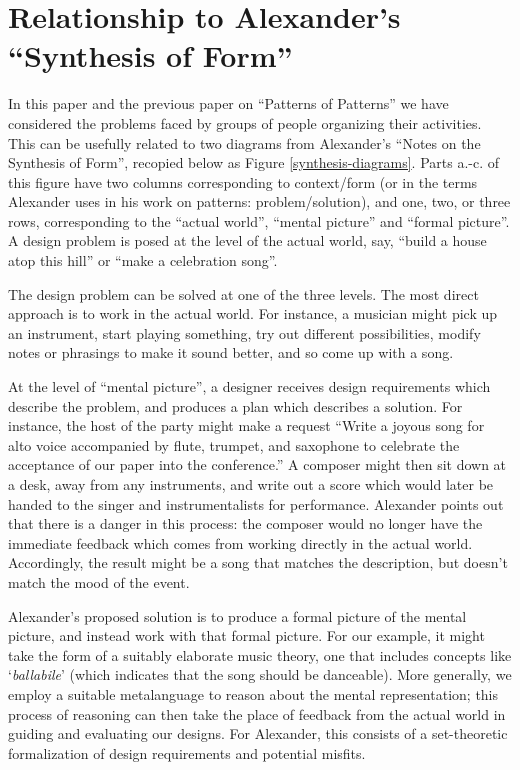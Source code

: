 \documentclass[acmlarge,timestamp]{acmart}
\begin{document}
\appendix
\renewcommand\thefigure{\thesection.\arabic{figure}}

\setcounter{figure}{0}
\section{Relationship to Alexander’s “Synthesis of Form”\label{synthesis-of-form}}
In this paper and the previous paper on “Patterns of Patterns” we have
considered the problems faced by groups of people organizing their
activities.  This can be usefully related to two diagrams from
Alexander's ``Notes on the Synthesis of Form'', recopied below as
Figure \ref{synthesis-diagrams}.  Parts a.-c. of this figure have two
columns corresponding to context/form (or in the terms Alexander uses
in his work on patterns: problem/solution), and one, two, or three
rows, corresponding to the ``actual world'', ``mental picture'' and
``formal picture''.  A design problem is posed at the level of the
actual world, say, ``build a house atop this hill'' or ``make a
celebration song''.

The design problem can be solved at one of the three levels.  The most
direct approach is to work in the actual world.  For instance, a
musician might pick up an instrument, start playing something, try out
different possibilities, modify notes or phrasings to make it sound
better, and so come up with a song.

At the level of ``mental picture'', a designer receives design
requirements which describe the problem, and produces a plan which
describes a solution.  For instance, the host of the party might make
a request ``Write a joyous song for alto voice accompanied by flute,
trumpet, and saxophone to celebrate the acceptance of our paper into
the conference.''  A composer might then sit down at a desk, away from
any instruments, and write out a score which would later be handed to
the singer and instrumentalists for performance.  Alexander points out
that there is a danger in this process: the composer would no longer
have the immediate feedback which comes from working directly in the
actual world.  Accordingly, the result might be a song that matches
the description, but doesn’t match the mood of the event.

Alexander’s proposed solution is to produce a formal picture of the
mental picture, and instead work with that formal picture.  For our
example, it might take the form of a suitably elaborate music theory,
one that includes concepts like ‘\emph{ballabile}’ (which indicates
that the song should be danceable).  More generally, we employ a
suitable metalanguage to reason about the mental representation; this
process of reasoning can then take the place of feedback from the
actual world in guiding and evaluating our designs.  For Alexander,
this consists of a set-theoretic formalization of design requirements
and potential misfits.
\end{document}
